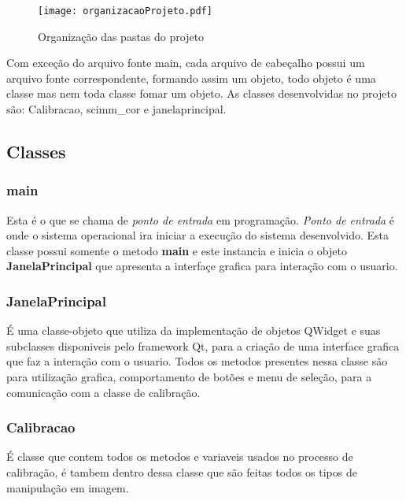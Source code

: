 	\begin{figure}[!h]
		\centering
		\texttt{[image: organizacaoProjeto.pdf]}
		\caption{Organização das pastas do projeto}
		\label{Organizacao do Projeto}
	\end{figure}
	Com exceção do arquivo fonte main, cada arquivo de cabeçalho possui um arquivo fonte correspondente, formando assim um objeto, todo objeto é uma classe mas nem toda classe fomar um objeto. As classes desenvolvidas no projeto são: Calibracao, scimm\_cor e janelaprincipal.

\subsection{Classes}
\subsubsection{main}
 Esta é o que se chama de \textit{ponto de entrada} em programação. \textit{Ponto de entrada} é onde o sistema operacional ira iniciar a execução do sistema desenvolvido. Esta classe possui somente o metodo \textbf{main} e este instancia e inicia o objeto \textbf{JanelaPrincipal} que apresenta a interfaçe grafica para interação com o usuario.
 
\subsubsection{JanelaPrincipal}
É uma classe-objeto que utiliza da implementação de objetos QWidget e suas subclasses disponiveis pelo framework Qt, para a criação de uma interface grafica que faz a interação com o usuario. Todos os metodos presentes nessa classe são para utilização grafica, comportamento de botões e menu de seleção, para a comunicação com a classe de calibração.	

\subsubsection{Calibracao}
 É classe que contem todos os metodos e variaveis usados no processo de calibração, é tambem dentro dessa classe que são feitas todos os tipos de manipulação em imagem.
 
